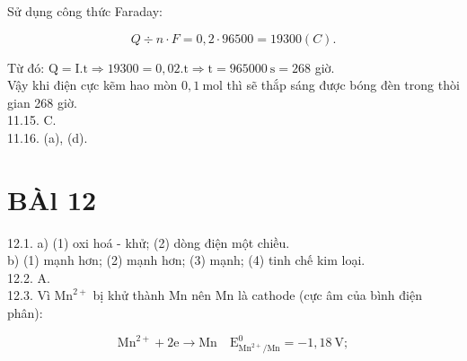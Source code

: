 \documentclass[10pt]{article}
\begin{document}
Sử dụng công thức Faraday:

$$
Q \div n \cdot F=0,2 \cdot 96500=19300(C) .
$$

Từ đó: $\mathrm{Q}=\mathrm{I} . \mathrm{t} \Rightarrow 19300=0,02 . \mathrm{t} \Rightarrow \mathrm{t}=965000 \mathrm{~s}=268$ giờ.\\
Vậy khi điện cực kẽm hao mòn $0,1 \mathrm{~mol}$ thì sẽ thắp sáng được bóng đèn trong thòi gian 268 giờ.\\
11.15. C.\\
11.16. (a), (d).

\section*{BÀl 12}
12.1. a) (1) oxi hoá - khử; (2) dòng điện một chiều.\\
b) (1) mạnh hơn; (2) mạnh hơn; (3) mạnh; (4) tinh chế kim loại.\\
12.2. A.\\
12.3. Vì $\mathrm{Mn}^{2+}$ bị khử thành Mn nên Mn là cathode (cực âm của bình điện phân):

$$
\mathrm{Mn}^{2+}+2 \mathrm{e} \rightarrow \mathrm{Mn} \quad \mathrm{E}_{\mathrm{Mn}^{2+} / \mathrm{Mn}}^{0}=-1,18 \mathrm{~V} ;
$$
\end{document}
